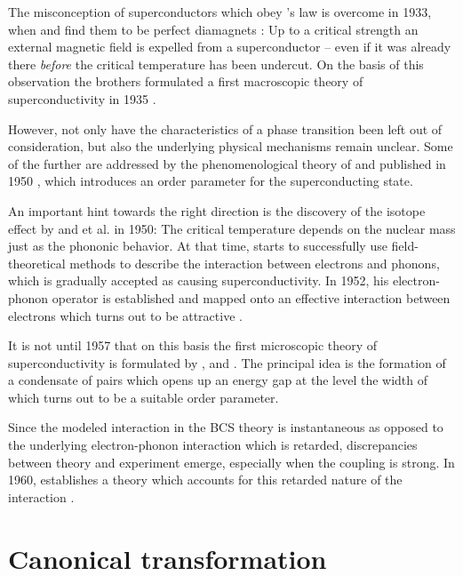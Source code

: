 The misconception of superconductors which obey 's law is overcome in
1933, when  and  find them to be perfect
diamagnets \cite{MeissnerOchsenfeld33}: Up to a critical strength an external
magnetic field is expelled from a superconductor -- even if it was already there
\emph{before} the critical temperature has been undercut. On the basis of this
observation the  brothers formulated a first macroscopic theory of
superconductivity in 1935 \cite{LondonLondon35}.

However, not only have the characteristics of a phase transition been left out
of consideration, but also the underlying physical mechanisms remain unclear.
Some of the further are addressed by the phenomenological theory of
 and  published in 1950 \cite{GinzburgLandau50},
which introduces an order parameter for the superconducting state.

An important hint towards the right direction is the discovery of the isotope
effect by  \cite{Maxwell50} and  et al.
\cite{ReynoldsSerinWrightNesbitt50} in 1950: The critical temperature depends on
the nuclear mass just as the phononic behavior. At that time, 
starts to successfully use field-theoretical methods to describe the interaction
between electrons and phonons, which is gradually accepted as causing
superconductivity. In 1952, his electron-phonon  operator is
established and mapped onto an effective interaction between electrons which
turns out to be attractive \cite{Froehlich52}.

It is not until 1957 that on this basis the first microscopic theory of
superconductivity is formulated by ,  and
 \cites {BardeenCooperSchrieffer57a}
{BardeenCooperSchrieffer57b}. The principal idea is the formation of a
condensate of  pairs which opens up an energy gap at the
 level the width of which turns out to be a suitable order
parameter.

Since the modeled interaction in the BCS theory is instantaneous as opposed to
the underlying electron-phonon interaction which is retarded, discrepancies
between theory and experiment emerge, especially when the coupling is strong. In
1960,  establishes a theory which accounts for this retarded
nature of the interaction \cite{Eliashberg60}.

\section{Canonical transformation}

